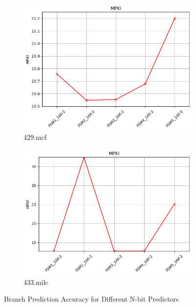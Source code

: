 \documentclass{article}
\begin{document}
\begin{figure}[H]
     \vspace{0.5cm} %
 
     \begin{subfigure}[b]{0.45\textwidth}
         \includegraphics[width=\textwidth]{figures/5_3_b/429.mcf.cslab_branch_preds_ref.out.png}
         \caption{429.mcf}
         \label{fig:plot21}
     \end{subfigure}
     \hfill
     \begin{subfigure}[b]{0.45\textwidth}
         \includegraphics[width=\textwidth]{figures/5_3_b/433.milc.cslab_branch_preds_ref.out.png}
         \caption{433.milc}
         \label{fig:plot22}
     \end{subfigure}
     \vspace{0.5cm} 
 
     \caption{Branch Prediction Accuracy for Different N-bit Predictors}
     \label{fig:fsm}
 \end{figure}
 
\end{document}
